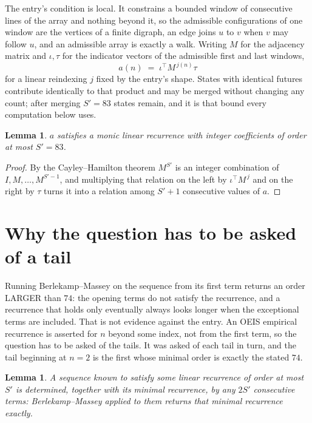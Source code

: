 \documentclass[11pt,a4paper]{article}
\theoremstyle{plain}
\newtheorem{lemma}[theorem]{Lemma}
\theoremstyle{definition}
\begin{document}
The entry's condition is local. It constrains a bounded window of consecutive lines of the
array and nothing beyond it, so the admissible configurations of one window are the vertices of
a finite digraph, an edge joins $u$ to $v$ when $v$ may follow $u$, and an admissible array is
exactly a walk. Writing $M$ for the adjacency matrix and $\iota,\tau$ for the indicator vectors
of the admissible first and last windows,
\[
a(n)\;=\;\iota^{\!\top}M^{\,j(n)}\tau
\]
for a linear reindexing $j$ fixed by the entry's shape. States with identical futures
contribute identically to that product and may be merged without changing any count; after
merging $S'=83$ states remain, and it is that bound every computation below uses.

\begin{lemma}\label{lem:cf}
$a$ satisfies a monic linear recurrence with integer coefficients of order at most $S'=83$.
\end{lemma}

\begin{proof}
By the Cayley--Hamilton theorem $M^{S'}$ is an integer combination of $I,M,\dots,M^{S'-1}$,
and multiplying that relation on the left by $\iota^{\!\top}M^{\,j}$ and on the right by
$\tau$ turns it into a relation among $S'+1$ consecutive values of $a$.
\end{proof}

\section{Why the question has to be asked of a tail}

Running Berlekamp--Massey on the sequence from its first term returns an order LARGER than $74$: the opening terms do not satisfy the recurrence, and a recurrence that holds only eventually always looks longer when the exceptional terms are included. That is not evidence against the entry. An OEIS empirical recurrence is asserted for $n$ beyond some index, not from the first term, so the question has to be asked of the tails. It was asked of each tail in turn, and the tail beginning at $n=2$ is the first whose minimal order is exactly the stated $74$.

\begin{lemma}\label{lem:bm}
A sequence known to satisfy some linear recurrence of order at most $S'$ is determined,
together with its minimal recurrence, by any $2S'$ consecutive terms: Berlekamp--Massey applied
to them returns that minimal recurrence exactly.
\end{lemma}
\end{document}
